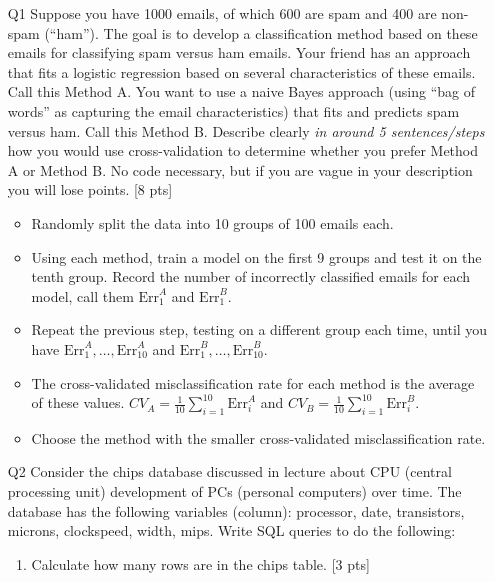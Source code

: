\documentclass[12pt]{article}
\theoremstyle{Conjecture}
\theoremstyle{example}
\theoremstyle{remark}
\theoremstyle{lemma}
\theoremstyle{definition}
\theoremstyle{corol}
\theoremstyle{proposition}
\theoremstyle{condition}
\begin{document}
\begin{enumerate}

\item[Q1] Suppose you have 1000 emails, of which 600 are spam and 400
  are non-spam (``ham''). The goal is to develop a classification
  method based on these emails for classifying spam versus ham
  emails. Your friend has an approach that fits a logistic regression
  based on several characteristics of these emails. Call this Method
  A. You want to use a naive Bayes approach (using ``bag of words'' as
  capturing the email characteristics) that fits and predicts spam
  versus ham. Call this Method B. Describe clearly {\it in around 5
    sentences/steps} how you would use cross-validation to determine
  whether you prefer Method A or Method B. No code necessary, but if
  you are vague in your description you will lose points.  [8 pts]

{\color{blue}
\begin{itemize}
	\item Randomly split the data into 10 groups of 100 emails each.
	\item Using each method, train a model on the first 9 groups and test it on the tenth group. Record the number of incorrectly classified emails for each model, call them $\textrm{Err}^A_1$ and $\textrm{Err}^B_1$.
	\item Repeat the previous step, testing on a different group each time, until you have $\textrm{Err}^A_1, \dots, \textrm{Err}^A_{10}$ and $\textrm{Err}^B_1, \dots, \textrm{Err}^B_{10}$.
	\item The cross-validated misclassification rate for each method is the average of these values. $CV_A = \frac{1}{10}\sum_{i=1}^{10} \textrm{Err}^A_i$ and $CV_B = \frac{1}{10}\sum_{i=1}^{10} \textrm{Err}^B_i$.
	\item Choose the method with the smaller cross-validated misclassification rate.
\end{itemize}
}
\newpage

\item [Q2] Consider the chips database discussed in lecture about CPU
  (central processing unit) development of PCs (personal computers)
  over time. The database has the following variables (column):
  processor, date, transistors, microns, clockspeed, width,
  mips. Write SQL queries to do the following:
\begin{enumerate}
\item Calculate how many rows are in the chips table. [3 pts]


\end{enumerate}
\end{enumerate}
\end{document}
